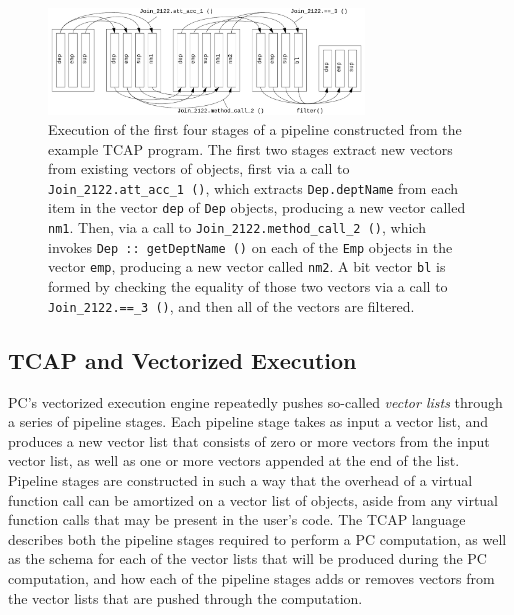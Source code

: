 \begin{figure}
  \begin{center}
    \includegraphics[width=3.3in]{TCAP}
  \end{center}
  \caption{Execution of the first four stages of a pipeline constructed from the example TCAP program.  The first two stages extract new vectors from 
existing vectors of objects, first via a call to
\texttt{Join\_2122.att\_acc\_1 ()}, which extracts
\texttt{Dep.deptName} from each item in the vector \texttt{dep}
of \texttt{Dep} objects, producing a new vector called \texttt{nm1}. Then,
via a call to \texttt{Join\_2122.method\_call\_2 ()}, which invokes \texttt{Dep :: getDeptName ()} on each of the \texttt{Emp} objects
in the vector \texttt{emp}, producing a new vector called \texttt{nm2}.  A bit vector \texttt{bl} is formed by checking the equality of those two 
vectors via a call to \texttt{Join\_2122.==\_3 ()}, and then all of the vectors are filtered.}
  \label{fig:TCAP}
\end{figure}


\subsection{TCAP and Vectorized Execution} \label{sec:vectorized}

PC's vectorized execution engine repeatedly pushes 
so-called \emph{vector lists} through a series of pipeline stages.  Each pipeline stage
takes as input a vector list,
and produces a 
new vector list that consists of zero or more vectors from the input
vector list, as well as one or more vectors appended at the end of the list.
Pipeline stages are constructed in such a way that the overhead of a
virtual function call can be amortized on a vector list of objects,
aside from any virtual function calls that may be
present 
in the user's code.
The TCAP language describes both the pipeline stages required to perform a PC computation, as well as the schema for each of the vector lists that
will be produced during the PC computation, and how each of the pipeline stages adds or removes vectors from the vector lists that are pushed through
the computation.


